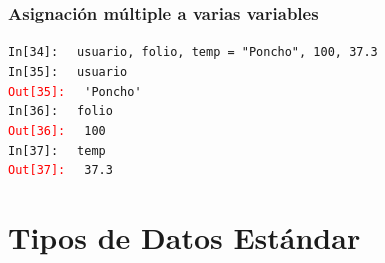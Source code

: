 \documentclass[12pt]{beamer}
\begin{document}
{\begin{frame}[fragile]
\frametitle{Asignación múltiple a varias variables}
\textcolor{ao}{\texttt{In[34]: }} \verb| usuario, folio, temp = "Poncho", 100, 37.3 | \\
\pause
\textcolor{ao}{\texttt{In[35]: }} \verb| usuario | \\
\pause
\textcolor{red}{\texttt{Out[35]: }} \verb| 'Poncho'| \\
\pause
\textcolor{ao}{\texttt{In[36]: }} \verb| folio | \\
\pause
\textcolor{red}{\texttt{Out[36]: }} \verb| 100| \\
\pause
\textcolor{ao}{\texttt{In[37]: }} \verb| temp| \\
\pause
\textcolor{red}{\texttt{Out[37]: }} \verb| 37.3|
\end{frame}
\section{Tipos de Datos Estándar}
}
\end{document}

